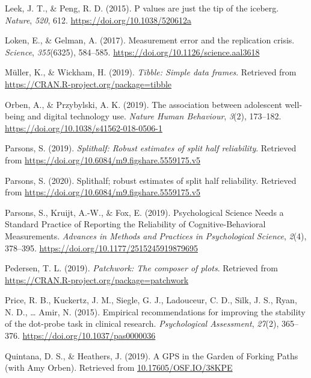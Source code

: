 \documentclass[english,man,floatsintext]{apa6}
\begin{document}
\leavevmode\hypertarget{ref-leek_p_2015}{}%
Leek, J. T., \& Peng, R. D. (2015). P values are just the tip of the iceberg. \emph{Nature}, \emph{520}, 612. \url{https://doi.org/10.1038/520612a}

\leavevmode\hypertarget{ref-loken_measurement_2017}{}%
Loken, E., \& Gelman, A. (2017). Measurement error and the replication crisis. \emph{Science}, \emph{355}(6325), 584--585. \url{https://doi.org/10.1126/science.aal3618}

\leavevmode\hypertarget{ref-R-tibble}{}%
Müller, K., \& Wickham, H. (2019). \emph{Tibble: Simple data frames}. Retrieved from \url{https://CRAN.R-project.org/package=tibble}

\leavevmode\hypertarget{ref-orben_association_2019}{}%
Orben, A., \& Przybylski, A. K. (2019). The association between adolescent well-being and digital technology use. \emph{Nature Human Behaviour}, \emph{3}(2), 173--182. \url{https://doi.org/10.1038/s41562-018-0506-1}

\leavevmode\hypertarget{ref-parsons_splithalf:_2019}{}%
Parsons, S. (2019). \emph{Splithalf: Robust estimates of split half reliability}. Retrieved from \url{https://doi.org/10.6084/m9.figshare.5559175.v5}

\leavevmode\hypertarget{ref-R-splithalf}{}%
Parsons, S. (2020). Splithalf; robust estimates of split half reliability. Retrieved from \url{https://doi.org/10.6084/m9.figshare.5559175.v5}

\leavevmode\hypertarget{ref-parsons_psychological_2019}{}%
Parsons, S., Kruijt, A.-W., \& Fox, E. (2019). Psychological Science Needs a Standard Practice of Reporting the Reliability of Cognitive-Behavioral Measurements. \emph{Advances in Methods and Practices in Psychological Science}, \emph{2}(4), 378--395. \url{https://doi.org/10.1177/2515245919879695}

\leavevmode\hypertarget{ref-R-patchwork}{}%
Pedersen, T. L. (2019). \emph{Patchwork: The composer of plots}. Retrieved from \url{https://CRAN.R-project.org/package=patchwork}

\leavevmode\hypertarget{ref-price_empirical_2015}{}%
Price, R. B., Kuckertz, J. M., Siegle, G. J., Ladouceur, C. D., Silk, J. S., Ryan, N. D., \ldots{} Amir, N. (2015). Empirical recommendations for improving the stability of the dot-probe task in clinical research. \emph{Psychological Assessment}, \emph{27}(2), 365--376. \url{https://doi.org/10.1037/pas0000036}

\leavevmode\hypertarget{ref-quintana_gps_2019}{}%
Quintana, D. S., \& Heathers, J. (2019). A GPS in the Garden of Forking Paths (with Amy Orben). Retrieved from \url{10.17605/OSF.IO/38KPE}
\end{document}
